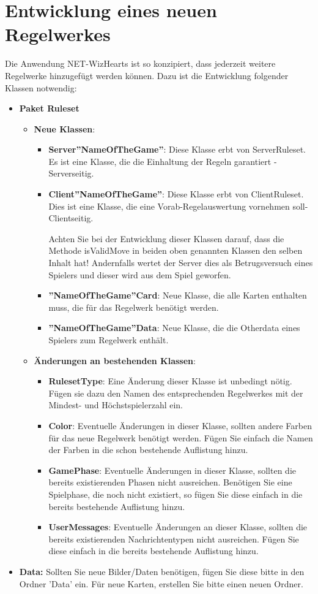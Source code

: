 \documentclass[titlepage,10pt,a4paper]{article}
\begin{document}
\section{Entwicklung eines neuen \gls{Regelwerk}es}
Die Anwendung NET-WizHearts ist so konzipiert, dass jederzeit weitere \gls{Regelwerk}e hinzugefügt werden können.
Dazu ist die Entwicklung folgender Klassen notwendig:
\begin{itemize}
\item \textbf{Paket Ruleset}
	\begin{itemize}
	\item \textbf{Neue Klassen}:
		\begin{itemize}
		\item \textbf{Server''NameOfTheGame''}: Diese Klasse erbt von ServerRuleset. Es ist eine Klasse, die die Einhaltung der Regeln garantiert - Serverseitig.
		\item \textbf{Client''NameOfTheGame''}: Diese Klasse erbt von ClientRuleset. Dies ist eine Klasse, die eine Vorab-Regelauswertung vornehmen soll- Clientseitig.
	
		 Achten Sie bei der Entwicklung dieser Klassen darauf, dass die Methode isValidMove in beiden oben genannten Klassen den selben Inhalt hat! Andernfalls wertet der Server dies als Betrugsversuch eines Spielers und dieser wird aus dem Spiel geworfen.
		 \item \textbf{''NameOfTheGame''Card}: Neue Klasse, die alle Karten enthalten muss, die für das Regelwerk benötigt werden.
		\item \textbf{''NameOfTheGame''Data}: Neue Klasse, die die Otherdata eines Spielers zum Regelwerk enthält.
	\end{itemize}
	\item \textbf{Änderungen an bestehenden Klassen}:
		\begin{itemize}
		\item \textbf{RulesetType}: Eine Änderung dieser Klasse ist unbedingt nötig. Fügen sie dazu den Namen des entsprechenden Regelwerkes mit der Mindest- und Höchstspielerzahl ein.
		\item \textbf{Color}: Eventuelle Änderungen in dieser Klasse, sollten andere Farben für das neue Regelwerk benötigt werden. Fügen Sie einfach die Namen der Farben in die schon bestehende Auflistung hinzu.
		\item \textbf{GamePhase}: Eventuelle Änderungen in dieser Klasse, sollten die bereits existierenden Phasen nicht ausreichen. Benötigen Sie eine Spielphase, die noch nicht existiert, so fügen Sie diese einfach in die bereits bestehende Auflistung hinzu.
		\item \textbf{UserMessages}: Eventuelle Änderungen an dieser Klasse, sollten die bereits existierenden Nachrichtentypen nicht ausreichen. Fügen Sie diese einfach in die bereits bestehende Auflistung hinzu.
		\end{itemize}
	\end{itemize}
\item \textbf{Data:} Sollten Sie neue Bilder/Daten benötigen, fügen Sie diese bitte in den Ordner 'Data' ein. Für neue Karten, erstellen Sie bitte einen neuen Ordner.
\end{itemize}

\newpage
\printglossaries
\end{document}
